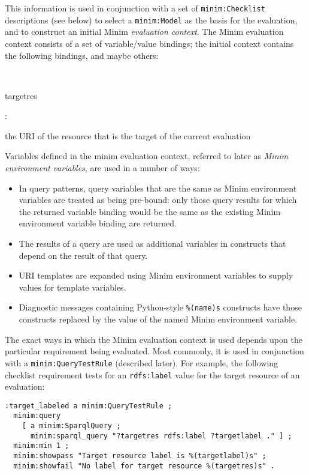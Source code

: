 \documentclass[]{article}
\begin{document}
This information is used in conjunction with a set of
\texttt{minim:Checklist} descriptions (see below) to select a
\texttt{minim:Model} as the basis for the evaluation, and to construct
an initial Minim \emph{evaluation context}. The Minim evaluation context
consists of a set of variable/value bindings; the initial context
contains the following bindings, and maybe others:

~~

targetres

:

the URI of the resource that is the target of the current evaluation

Variables defined in the minim evaluation context, referred to later as
\emph{Minim environment variables}, are used in a number of ways:

\begin{itemize}
\itemsep1pt\parskip0pt
\item
  In query patterns, query variables that are the same as Minim
  environment variables are treated as being pre-bound: only those query
  results for which the returned variable binding would be the same as
  the existing Minim environment variable binding are returned.
\item
  The results of a query are used as additional variables in constructs
  that depend on the result of that query.
\item
  URI templates are expanded using Minim environment variables to supply
  values for template variables.
\item
  Diagnostic messages containing Python-style \texttt{\%(name)s}
  constructs have those constructs replaced by the value of the named
  Minim environment variable.
\end{itemize}

The exact ways in which the Minim evaluation context is used depends
upon the particular requirement being evaluated. Most commonly, it is
used in conjunction with a \texttt{minim:QueryTestRule} (described
later). For example, the following checklist requirement tests for an
\texttt{rdfs:label} value for the target resource of an evaluation:

\begin{verbatim}
:target_labeled a minim:QueryTestRule ;
  minim:query 
    [ a minim:SparqlQuery ; 
      minim:sparql_query "?targetres rdfs:label ?targetlabel ." ] ;
  minim:min 1 ;
  minim:showpass "Target resource label is %(targetlabel)s" ;
  minim:showfail "No label for target resource %(targetres)s" .
\end{verbatim}
\end{document}
